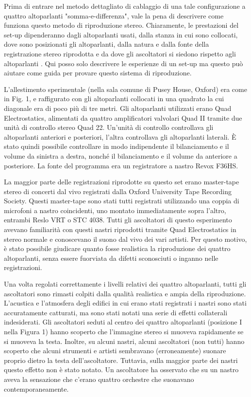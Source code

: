 \documentclass[11pt]{article}
\begin{document}
\begin{multicols*}{2}
Prima di entrare nel metodo dettagliato di cablaggio di una tale configurazione a quattro altoparlanti "somma-e-differenza", vale la pena di descrivere come funziona questo metodo di riproduzione stereo. Chiaramente, le prestazioni del set-up dipenderanno dagli altoparlanti usati, dalla stanza in cui sono collocati, dove sono posizionati gli altoparlanti, dalla natura e dalla fonte della registrazione stereo riprodotta e da dove gli ascoltatori si siedono rispetto agli altoparlanti . Qui posso solo descrivere le esperienze di un set-up ma questo può aiutare come guida per provare questo sistema di riproduzione. 

L'allestimento sperimentale (nella sala comune di Pusey House, Oxford) era come in Fig. 1, e raffigurato con gli altoparlanti collocati in una quadrato la cui diagonale era di poco più di tre metri. Gli altoparlanti utilizzati erano Quad Electrostatics, alimentati da quattro amplificatori valvolari Quad II tramite due unità di controllo stereo Quad 22. Un'unità di controllo controllava gli altoparlanti anteriori e posteriori, l'altra controllava gli altoparlanti laterali. È stato quindi possibile controllare in modo indipendente il bilanciamento e il volume da sinistra a destra, nonché il bilanciamento e il volume da anteriore a posteriore. La fonte del programma era un registratore a nastro Revox F36HS.

La maggior parte delle registrazioni riprodotte su questo set erano master-tape stereo di concerti dal vivo registrati dalla Oxford University Tape Recording Society. Questi master-tape sono stati tutti registrati utilizzando una coppia di microfoni a nastro coincidenti, uno montato immediatamente sopra l’altro, entrambi Reslo VRT o STC 4038. Tutti gli ascoltatori di questo esperimento avevano familiarità con questi nastri riprodotti tramite Quad Electrostatics in stereo normale e conoscevano il suono dal vivo dei vari artisti. Per questo motivo, è stato possibile giudicare quanto fosse realistica la riproduzione dei quattro altoparlanti, senza essere fuorviata da difetti sconosciuti o inganno nelle registrazioni.

Una volta regolati correttamente i livelli relativi dei quattro altoparlanti, tutti gli ascoltatori sono rimasti colpiti dalla qualità realistica e ampia della riproduzione. L'acustica e l'atmosfera degli edifici in cui erano stati registrati i nastri sono stati accuratamente catturati, ma sono stati notati una serie di effetti collaterali indesiderati. Gli ascoltatori seduti al centro dei quattro altoparlanti (posizione I nella Figura 1) hanno scoperto che l'immagine stereo si muoveva rapidamente se si muoveva la testa. Inoltre, su alcuni nastri, alcuni ascoltatori (non tutti) hanno scoperto che alcuni strumenti e artisti sembravano (erroneamente) suonare proprio dietro la testa dell'ascoltatore. Tuttavia, sulla maggior parte dei nastri questo effetto non è stato notato. Un ascoltatore ha osservato che su un nastro aveva la sensazione che c'erano quattro orchestre che suonavano contemporaneamente.


\end{multicols*}
\end{document}
